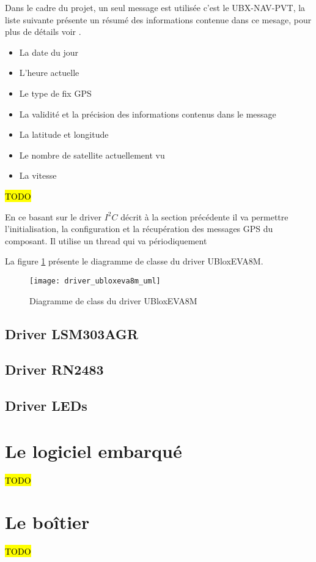 Dans le cadre du projet, un seul message est utilisée c'est le UBX-NAV-PVT, la liste suivante présente un résumé des informations contenue dans ce mesage, pour plus de détails voir \cite[p.~307]{ublox-protocol}.

\begin{itemize}
 \item La date du jour
 \item L'heure actuelle 
 \item Le type de fix GPS
 \item La validité et la précision des informations contenus dans le message
 \item La latitude et longitude
 \item Le nombre de satellite actuellement vu
 \item La vitesse
 \end{itemize} 

\hl{TODO}

En ce basant sur le driver $I^{2}C$ décrit à la section précédente il va permettre l'initialisation, la configuration et la récupération des messages GPS du composant. Il utilise un thread qui va périodiquement 

La figure \ref{fig:driver_ubloxeva8m_uml} présente le diagramme de classe du driver UBloxEVA8M.

\begin{figure}[htb]
\centering 
\texttt{[image: driver\_ubloxeva8m\_uml]} 
\caption{Diagramme de class du driver UBloxEVA8M}
\label{fig:driver_ubloxeva8m_uml}
\end{figure}







\subsection{Driver LSM303AGR}

\subsection{Driver RN2483}

\subsection{Driver LEDs}


\section{Le logiciel embarqué}

\hl{TODO}

\section{Le boîtier}

\hl{TODO}
